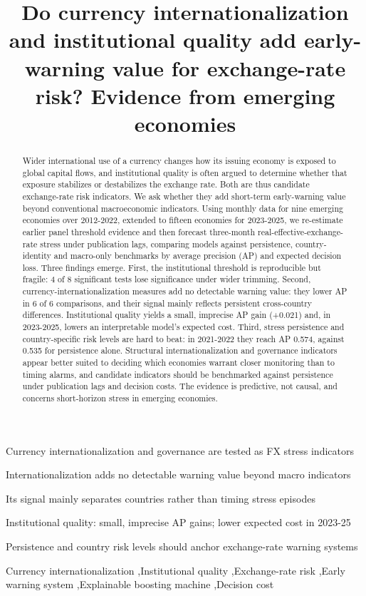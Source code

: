 \documentclass[preprint,12pt,authoryear]{elsarticle}
\begin{document}
\begin{frontmatter}
\title{Do currency internationalization and institutional quality add early-warning value for exchange-rate risk? Evidence from emerging economies}
\begin{abstract}
Wider international use of a currency changes how its issuing economy is exposed to global capital flows, and institutional quality is often argued to determine whether that exposure stabilizes or destabilizes the exchange rate. Both are thus candidate exchange-rate risk indicators. We ask whether they add short-term early-warning value beyond conventional macroeconomic indicators. Using monthly data for nine emerging economies over 2012-2022, extended to fifteen economies for 2023-2025, we re-estimate earlier panel threshold evidence and then forecast three-month real-effective-exchange-rate stress under publication lags, comparing models against persistence, country-identity and macro-only benchmarks by average precision (AP) and expected decision loss. Three findings emerge. First, the institutional threshold is reproducible but fragile: 4 of 8 significant tests lose significance under wider trimming. Second, currency-internationalization measures add no detectable warning value: they lower AP in 6 of 6 comparisons, and their signal mainly reflects persistent cross-country differences. Institutional quality yields a small, imprecise AP gain (+0.021) and, in 2023-2025, lowers an interpretable model's expected cost. Third, stress persistence and country-specific risk levels are hard to beat: in 2021-2022 they reach AP 0.574, against 0.535 for persistence alone. Structural internationalization and governance indicators appear better suited to deciding which economies warrant closer monitoring than to timing alarms, and candidate indicators should be benchmarked against persistence under publication lags and decision costs. The evidence is predictive, not causal, and concerns short-horizon stress in emerging economies.
\end{abstract}
\begin{highlights}
\item Currency internationalization and governance are tested as FX stress indicators
\item Internationalization adds no detectable warning value beyond macro indicators
\item Its signal mainly separates countries rather than timing stress episodes
\item Institutional quality: small, imprecise AP gains; lower expected cost in 2023-25
\item Persistence and country risk levels should anchor exchange-rate warning systems
\end{highlights}
\begin{keyword}
Currency internationalization \sep Institutional quality \sep Exchange-rate risk \sep Early warning system \sep Explainable boosting machine \sep Decision cost
\end{keyword}
\end{frontmatter}
\end{document}
